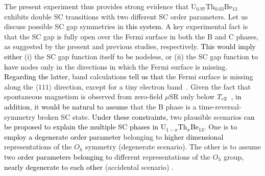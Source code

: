 \documentclass[twocolumn, prl]{revtex4}%
\newcommand{\correct}[1]{\textcolor{black}{#1}}
\begin{document}
The present experiment thus provides strong evidence that U$_{0.97}$Th$_{0.03}$Be$_{13}$ exhibits
  double SC transitions \color{black} with two different SC order parameters.
Let us  discuss   possible SC gap symmetries in \correct{this system}.
 A key experimental fact is that the SC gap is fully open over the Fermi surface in both the B and C phases,
 as suggested by the present and previous \cite{YShimizu_PRL_2015} studies, respectively.
\color{black}
\correct{This would imply either}
 (i) the SC gap function itself \correct{to be} nodeless, or 
 (ii) the SC gap function \correct{to have} nodes only in the directions in which the Fermi surface is missing. 
\correct{Regarding the latter,} band calculations \correct{tell us that}
 the Fermi surface is missing along the $\langle 111\rangle$ direction, except for a tiny electron band~\cite{Takegahara_PhysicaB_2000, Maehira_PhysicaB_2002}.
Given the fact that spontaneous magnetism is observed from zero-field $\mu$SR only
  below $T_{\rm c2}$~\cite{Heffner_PRL_1990}, \correct{in addition},
 it \correct{would be natural to assume} that the B phase is a time-reversal-symmetry broken SC state.
\correct{Under these constraints,} two plausible scenarios \correct{can be proposed to explain the multiple SC phases in U$_{1-x}$Th$_{x}$Be$_{13}$.}
One  is \correct{to employ a degenerate order parameter} 
  belonging to \correct{higher dimensional} representations of  the $O_{h}$ symmetry  (degenerate scenario). 
The other is  to assume  
two \correct{order parameters belonging to} different representations of the $O_{h}$ group,   \correct{nearly degenerate to each other} (accidental scenario)
 \cite{Sigrist_RevModPhys_1991}. 
\end{document}
